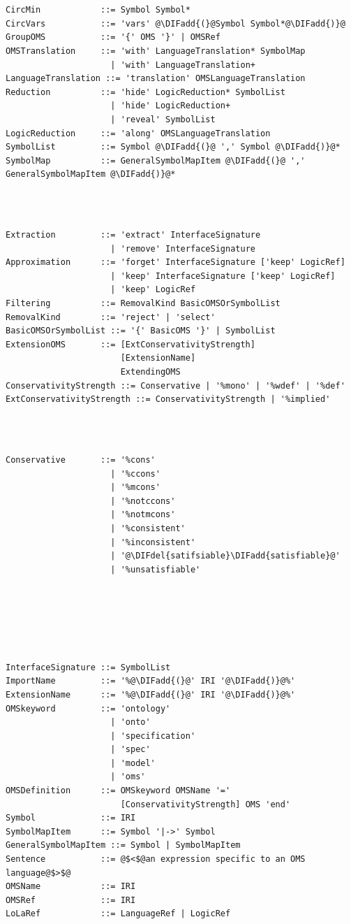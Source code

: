 \documentclass[10pt, a4paper]{isov2}
\newcommand{\bc}[1]{~\\{\color{violet}\large \hrulefill \href{http://issues.omg.org/browse/DOL-#1}{\normalfont{JIRA DOL-{}#1}} \hrulefill\\}  }
\newcommand{\ec}[0]{~\\{{\color{violet}\large \hrulefill {\normalfont{end}} \hrulefill\\}  }}
\newcommand{\bcnew}[1]{~\\{\color{red}\large \hrulefill \href{http://issues.omg.org/browse/DOL-#1}{\normalfont{JIRA DOL-{}#1}} \hrulefill\\}  }
\newcommand{\ecnew}[0]{~\\{{\color{red}\large \hrulefill {\normalfont{end}} \hrulefill\\}  }}
\providecommand{\DIFaddtex}[1]{{\protect\color{blue}\uwave{#1}}} %
\providecommand{\DIFdeltex}[1]{{\protect\color{red}\sout{#1}}}                      %
\providecommand{\DIFadd}[1]{\texorpdfstring{\DIFaddtex{#1}}{#1}} %
\providecommand{\DIFdel}[1]{\texorpdfstring{\DIFdeltex{#1}}{}} %
\begin{document}
\bc{92}
\begin{lstlisting}[language=ebnf,mathescape]
CircMin            ::= Symbol Symbol*
CircVars           ::= 'vars' @\DIFadd{(}@Symbol Symbol*@\DIFadd{)}@
GroupOMS           ::= '{' OMS '}' | OMSRef
OMSTranslation     ::= 'with' LanguageTranslation* SymbolMap
                     | 'with' LanguageTranslation+
LanguageTranslation ::= 'translation' OMSLanguageTranslation
Reduction          ::= 'hide' LogicReduction* SymbolList
                     | 'hide' LogicReduction+
                     | 'reveal' SymbolList
LogicReduction     ::= 'along' OMSLanguageTranslation
SymbolList         ::= Symbol @\DIFadd{(}@ ',' Symbol @\DIFadd{)}@*
SymbolMap          ::= GeneralSymbolMapItem @\DIFadd{(}@ ',' GeneralSymbolMapItem @\DIFadd{)}@*
\end{lstlisting}
\ec

\begin{lstlisting}[language=ebnf,mathescape]
Extraction         ::= 'extract' InterfaceSignature
                     | 'remove' InterfaceSignature
Approximation      ::= 'forget' InterfaceSignature ['keep' LogicRef]
                     | 'keep' InterfaceSignature ['keep' LogicRef]
                     | 'keep' LogicRef
Filtering          ::= RemovalKind BasicOMSOrSymbolList
RemovalKind        ::= 'reject' | 'select'
BasicOMSOrSymbolList ::= '{' BasicOMS '}' | SymbolList
ExtensionOMS       ::= [ExtConservativityStrength]
                       [ExtensionName]
                       ExtendingOMS
ConservativityStrength ::= Conservative | '%mono' | '%wdef' | '%def'
ExtConservativityStrength ::= ConservativityStrength | '%implied'
\end{lstlisting}

\bcnew{43}
\begin{lstlisting}[language=ebnf,mathescape]
Conservative       ::= '%cons'
                     | '%ccons'
                     | '%mcons'
                     | '%notccons'
                     | '%notmcons'
                     | '%consistent'
                     | '%inconsistent'
                     | '@\DIFdel{satifsiable}\DIFadd{satisfiable}@'
                     | '%unsatisfiable'
\end{lstlisting}
\ecnew

\bc{92}
\begin{lstlisting}[language=ebnf,mathescape]
InterfaceSignature ::= SymbolList
ImportName         ::= '%@\DIFadd{(}@' IRI '@\DIFadd{)}@%'
ExtensionName      ::= '%@\DIFadd{(}@' IRI '@\DIFadd{)}@%'
OMSkeyword         ::= 'ontology'
                     | 'onto'
                     | 'specification'
                     | 'spec'
                     | 'model'
                     | 'oms'
OMSDefinition      ::= OMSkeyword OMSName '='
                       [ConservativityStrength] OMS 'end'
Symbol             ::= IRI
SymbolMapItem      ::= Symbol '|->' Symbol
GeneralSymbolMapItem ::= Symbol | SymbolMapItem
Sentence           ::= @$<$@an expression specific to an OMS language@$>$@ 
OMSName            ::= IRI
OMSRef             ::= IRI
LoLaRef            ::= LanguageRef | LogicRef
\end{lstlisting}
\ec
\end{document}
